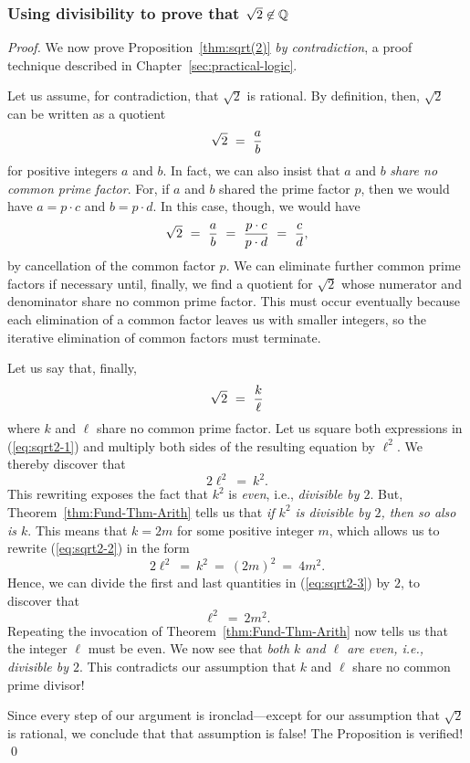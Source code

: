 \subsubsection{Using divisibility to prove that $\sqrt{2} \not\in \mathbb{Q}$}
\label{sec:classical-proof-sqrt(2)}

\begin{proof}
We now prove Proposition~\ref{thm:sqrt(2)} {\em by
contradiction}, a proof technique
described in Chapter~\ref{sec:practical-logic}.

Let us assume, for contradiction, that $\sqrt{2}$ is rational.  By
definition, then, $\sqrt{2}$ can be written as a quotient
\[ \sqrt{2} \ = \ {a \over b} \]
for positive integers $a$ and $b$.  In fact, we can also insist that
$a$ and $b$ {\em share no common prime factor}.  For, if $a$ and $b$
shared the prime factor $p$, then we would have $a = p \cdot c$ and
$b = p \cdot d$.  In this case, though, we would have
\[ \sqrt{2} \ = \ {a \over b} \ = \ \frac{p \cdot c}{p \cdot d}
\ = \ {c \over d},
\]
by cancellation of the common factor $p$.  We can eliminate further
common prime factors if necessary until, finally, we find a quotient
for $\sqrt{2}$ whose numerator and denominator share no common prime
factor.  This must occur eventually because each elimination of a
common factor leaves us with smaller integers, so the iterative
elimination of common factors must terminate.

Let us say that, finally,
\begin{equation}
\label{eq:sqrt2-1}
\sqrt{2} \ = \ {k \over \ell}
\end{equation}
where $k$ and $\ell$ share no common prime factor.  Let us square both
expressions in (\ref{eq:sqrt2-1}) and multiply both sides of the
resulting equation by $\ell^2$.  We thereby discover that
\begin{equation}
\label{eq:sqrt2-2}
2 \ell^2 \ = \ k^2.
\end{equation}
This rewriting exposes the fact that $k^2$ is {\em even},
i.e., {\em divisible by $2$}.  But, Theorem~\ref{thm:Fund-Thm-Arith}
tells us that {\em if $k^2$ is divisible by $2$, then so also is $k$}.
This means that $k = 2m$ for some positive integer $m$, which allows
us to rewrite (\ref{eq:sqrt2-2}) in the form
\begin{equation}
\label{eq:sqrt2-3}
2 \ell^2 \ = \ k^2 \ = \ (2m)^2 \ = \ 4m^2.
\end{equation}
Hence, we can divide the first and last quantities in
(\ref{eq:sqrt2-3}) by $2$, to discover that
\[ \ell^2 \ = \ 2m^2. \]
Repeating the invocation of Theorem~\ref{thm:Fund-Thm-Arith} now tells
us that the integer $\ell$ must be even.  We now see that {\em both
  $k$ and $\ell$ are even, i.e., divisible by $2$}.  This contradicts
our assumption that $k$ and $\ell$ share no common prime divisor!

Since every step of our argument is ironclad---except for our
assumption that $\sqrt{2}$ is rational, we conclude that that
assumption is false!  The Proposition is verified!  \qed
\end{proof}

